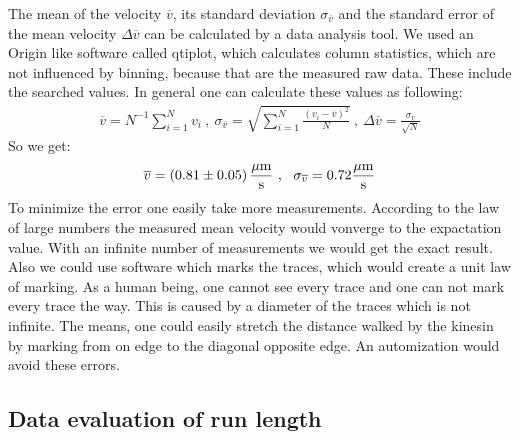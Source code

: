         \vspace{2mm}
        The mean of the velocity $\overline v$, its standard deviation $\sigma_{\overline v}$ and the standard error of the mean velocity $\Delta \overline v$ can be calculated by a data analysis tool. We used an Origin like software called qtiplot, which calculates column statistics, which are not influenced by binning, because that are the measured raw data. These include the searched values.
        In general one can calculate these values as following:
        \begin{eqnarray*}
            \overline v = N^{-1} \sum_{i = 1}^{N}v_i\ ,\ \sigma_{\overline v} = \sqrt{\sum_{i = 1}^{N} \frac{(v_i - \overline v)^2}{N}}\ , \ \Delta \overline v = \frac{\sigma_{\overline v}}{\sqrt{N}}
        \end{eqnarray*}
        So we get:
        $$ \overline v = \unit[(0.81 \pm 0.05)]{\frac{\mu m}{s}}\ , \ \ \sigma_{\overline v} = 0.72 \unit{\frac{\mu m}{s}}$$
        To minimize the error one easily take more measurements. According to the law of large numbers the measured mean velocity would vonverge to the expactation value. With an infinite number of measurements we would get the exact result. 
        Also we could use software which marks the traces, which would create a unit law of marking. As a human being, one cannot see every trace and one can not mark every trace the way. This is caused by a diameter of the traces which is not infinite. The means, one could easily stretch the distance walked by the kinesin by marking from on edge to the diagonal opposite edge. An automization would avoid these errors. 
    
    \subsection{Data evaluation of run length}